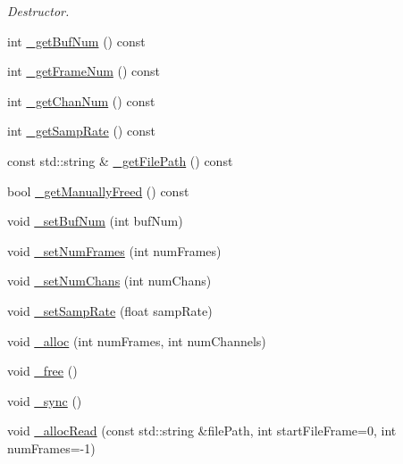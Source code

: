 \begin{DoxyCompactItemize}
\begin{DoxyCompactList}\small\item\em Destructor. \end{DoxyCompactList}\item 
int \hyperlink{classColliderPlusPlus_1_1Buffer_a6d2eb844b20eb62158d5d77bcb5d568c}{\-\_\-get\-Buf\-Num} () const 
\item 
int \hyperlink{classColliderPlusPlus_1_1Buffer_adbd84c84d0c13d9dcc96e36edce17448}{\-\_\-get\-Frame\-Num} () const 
\item 
int \hyperlink{classColliderPlusPlus_1_1Buffer_a1eca16cfed94680f3a14adcd4dfe42c9}{\-\_\-get\-Chan\-Num} () const 
\item 
int \hyperlink{classColliderPlusPlus_1_1Buffer_a6887218a82f341f668117cd24548921a}{\-\_\-get\-Samp\-Rate} () const 
\item 
const std\-::string \& \hyperlink{classColliderPlusPlus_1_1Buffer_a94c409839084712d7cc10fd46e520d68}{\-\_\-get\-File\-Path} () const 
\item 
bool \hyperlink{classColliderPlusPlus_1_1Buffer_abe0bd6783d6619ad9df0b5b6cd194d73}{\-\_\-get\-Manually\-Freed} () const 
\item 
void \hyperlink{classColliderPlusPlus_1_1Buffer_a4b9618d72d61ee996dd345a27211bb28}{\-\_\-set\-Buf\-Num} (int buf\-Num)
\item 
void \hyperlink{classColliderPlusPlus_1_1Buffer_a7edaeb1498a61623447082277c4cbb7a}{\-\_\-set\-Num\-Frames} (int num\-Frames)
\item 
void \hyperlink{classColliderPlusPlus_1_1Buffer_a7bb84b89cba1bbdcc85d5cd4e6cb8225}{\-\_\-set\-Num\-Chans} (int num\-Chans)
\item 
void \hyperlink{classColliderPlusPlus_1_1Buffer_a041e66c0645096ce0d134e6a1e1e93f3}{\-\_\-set\-Samp\-Rate} (float samp\-Rate)
\item 
void \hyperlink{classColliderPlusPlus_1_1Buffer_af0248190521ac9b499da2595f5519b12}{\-\_\-alloc} (int num\-Frames, int num\-Channels)
\item 
void \hyperlink{classColliderPlusPlus_1_1Buffer_acdb1aca3342219a321ff61645de4551f}{\-\_\-free} ()
\item 
void \hyperlink{classColliderPlusPlus_1_1Buffer_a2fd3166c7e5f7980176f265d4c6d8a53}{\-\_\-sync} ()
\item 
void \hyperlink{classColliderPlusPlus_1_1Buffer_a0cbb99a9823f18b151f7f7da4bcf56a7}{\-\_\-alloc\-Read} (const std\-::string \&file\-Path, int start\-File\-Frame=0, int num\-Frames=-\/1)
\end{DoxyCompactItemize}


